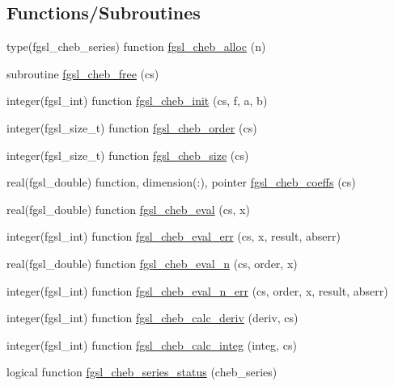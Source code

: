 \subsection*{Functions/\+Subroutines}
\begin{DoxyCompactItemize}
\item 
type(fgsl\+\_\+cheb\+\_\+series) function \hyperlink{chebyshev_8finc_a18d26925af2b33815928669f2d20c5fc}{fgsl\+\_\+cheb\+\_\+alloc} (n)
\item 
subroutine \hyperlink{chebyshev_8finc_a90dec86100b0f31a78ba02588fcb32fa}{fgsl\+\_\+cheb\+\_\+free} (cs)
\item 
integer(fgsl\+\_\+int) function \hyperlink{chebyshev_8finc_ab5144a511c4795aaa1aef381fba746fe}{fgsl\+\_\+cheb\+\_\+init} (cs, f, a, b)
\item 
integer(fgsl\+\_\+size\+\_\+t) function \hyperlink{chebyshev_8finc_a5779d00f29d0a47bdaca96cfac314d45}{fgsl\+\_\+cheb\+\_\+order} (cs)
\item 
integer(fgsl\+\_\+size\+\_\+t) function \hyperlink{chebyshev_8finc_a27d005e888c9e5c333f506c443f4a685}{fgsl\+\_\+cheb\+\_\+size} (cs)
\item 
real(fgsl\+\_\+double) function, dimension(\+:), pointer \hyperlink{chebyshev_8finc_a2316b05113eaf931af64fdc1d1a9cb34}{fgsl\+\_\+cheb\+\_\+coeffs} (cs)
\item 
real(fgsl\+\_\+double) function \hyperlink{chebyshev_8finc_a96a78f419947fd9bbf6807b72ebbb54e}{fgsl\+\_\+cheb\+\_\+eval} (cs, x)
\item 
integer(fgsl\+\_\+int) function \hyperlink{chebyshev_8finc_a0d44ec8fe2a70ec2aaaef7cfd8162d29}{fgsl\+\_\+cheb\+\_\+eval\+\_\+err} (cs, x, result, abserr)
\item 
real(fgsl\+\_\+double) function \hyperlink{chebyshev_8finc_ae34a6bce879de1fe39156fc359b1284d}{fgsl\+\_\+cheb\+\_\+eval\+\_\+n} (cs, order, x)
\item 
integer(fgsl\+\_\+int) function \hyperlink{chebyshev_8finc_a658cd8743b6ea29f95e45b09d1a4a33b}{fgsl\+\_\+cheb\+\_\+eval\+\_\+n\+\_\+err} (cs, order, x, result, abserr)
\item 
integer(fgsl\+\_\+int) function \hyperlink{chebyshev_8finc_afca0a21ed23434831b8e29d9d1f414f9}{fgsl\+\_\+cheb\+\_\+calc\+\_\+deriv} (deriv, cs)
\item 
integer(fgsl\+\_\+int) function \hyperlink{chebyshev_8finc_aed9d097bbf1263e532133c421b844d0a}{fgsl\+\_\+cheb\+\_\+calc\+\_\+integ} (integ, cs)
\item 
logical function \hyperlink{chebyshev_8finc_a757025ca75214fce2a6b57688ffa61b7}{fgsl\+\_\+cheb\+\_\+series\+\_\+status} (cheb\+\_\+series)
\end{DoxyCompactItemize}


